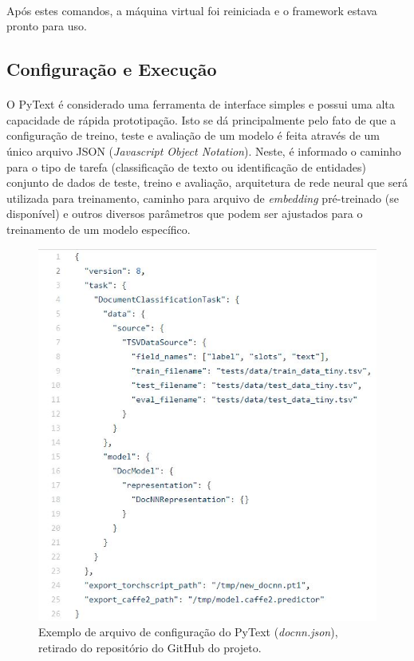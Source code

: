 \documentclass[grad,numbers]{coppe}
\begin{document}
			\paragraph{}Após estes comandos, a máquina virtual foi reiniciada e o framework estava pronto para uso.
  	\subsection{Configuração e Execução}
  		\paragraph{}O PyText é considerado uma ferramenta de interface simples e possui uma alta capacidade de rápida prototipação\cite{pytext-paper}. Isto se dá principalmente pelo fato de que a configuração de treino, teste e avaliação de um modelo é feita através de um único arquivo JSON (\textit{Javascript Object Notation}). Neste, é informado o caminho para o tipo de tarefa (classificação de texto ou identificação de entidades) conjunto de dados de teste, treino e avaliação, arquitetura de rede neural que será utilizada para treinamento, caminho para arquivo de \textit{embedding} pré-treinado (se disponível) e outros diversos parâmetros que podem ser ajustados para o treinamento de um modelo específico.
 			\begin{figure}[h]
			{\includegraphics[width=15cm]{pytext-config-ex.jpg}
				\caption{Exemplo de arquivo de configuração do PyText (\textit{docnn.json}), retirado do repositório do GitHub do projeto\cite{pytext-github}.}
				\label{fig:pytext-config-ex-fig}}
			\end{figure}
\end{document}
